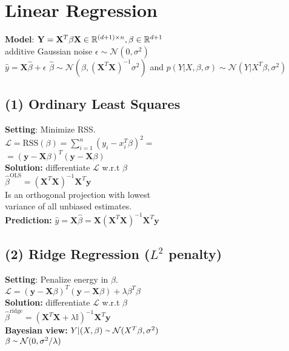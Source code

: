 \section*{Linear Regression}
\textbf{Model}:
$\mathbf{Y}=\mathbf{X}^T\beta \\
\mathbf{X}\in\mathbb{R}^{(d+1)\times n}, \beta \in \mathbb{R}^{d+1}$\\
additive Gaussian noise $\epsilon \sim \mathcal{N}(0,\sigma^2)$\\
$\hat{y}=\mathbf{X}\hat{\beta}+\epsilon$ \quad
$\hat{\beta} \sim \mathcal{N}(\beta, (\mathbf{X}^T\mathbf{X})^{-1}\sigma^2) $ and 
$p(Y|X,\beta, \sigma) \sim \mathcal{N}(Y|X^T\beta, \sigma^2)$



\subsection*{(1) Ordinary Least Squares}
\textbf{Setting}: Minimize RSS.\\
$\mathcal{L} = \text{RSS}(\beta)=\sum_{i=1}^n(y_i-x_i^T\beta)^2=$\\
$=(\mathbf{y}-\mathbf{X}\beta)^T(\mathbf{y}-\mathbf{X}\beta)$\\
\textbf{Solution:} differentiate $\mathcal{L}$ w.r.t $\beta$\\
$\hat{\beta}^\text{OLS} = (\mathbf{X}^T\mathbf{X})^{-1}\mathbf{X}^{T}\mathbf{y}$\\
Is an orthogonal projection with lowest \\
variance of all unbiased estimates.\\
\textbf{Prediction:} $\hat{y}{=}\mathbf{X}\hat{\beta}{=}\mathbf{X}(\mathbf{X}^T\mathbf{X})^{-1}\mathbf{X}^{T}\mathbf{y}$


\subsection*{(2) Ridge Regression ($L^2$ penalty)}
\textbf{Setting}: Penalize energy in $\beta$.\\
$\mathcal{L} = (\mathbf{y}-\mathbf{X}\beta)^T(\mathbf{y}-\mathbf{X}\beta)+\lambda\beta^T\beta$\\
\textbf{Solution:} differentiate $\mathcal{L}$ w.r.t $\beta$\\
$\hat{\beta}^\text{ridge} = (\mathbf{X}^T\mathbf{X}+\lambda\mathbb{I})^{-1}\mathbf{X}^{T}\mathbf{y}$ \\
\textbf{Bayesian view:} $Y|(X, \beta) \smallsim \mathcal{N}(X^T\beta, \sigma^2)$\\
$ \beta \smallsim \mathcal{N}(0, \sigma^2/\lambda)$

